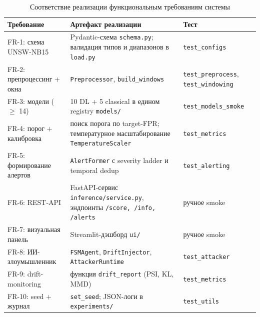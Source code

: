 \begin{table}[H]
\centering
\caption{Соответствие реализации функциональным требованиям системы}
\label{tab:traceability}
\renewcommand{\arraystretch}{1.2}
\setlength{\tabcolsep}{4pt}
\footnotesize
\begin{tabularx}{\linewidth}{@{}p{2.6cm}Xp{2.8cm}@{}}
\toprule
\textbf{Требование} & \textbf{Артефакт реализации} & \textbf{Тест} \\
\midrule
FR-1: схема UNSW-NB15      & Pydantic-схема \texttt{schema.py}; валидация типов и диапазонов в \texttt{load.py}                        & \texttt{test\_configs} \\
FR-2: препроцессинг + окна & \texttt{Preprocessor}, \texttt{build\_windows}                                                            & \texttt{test\_preprocess}, \texttt{test\_windowing} \\
FR-3: модели ($\geq$ 14)   & 10 DL + 5 classical в едином registry \texttt{models/}                                                    & \texttt{test\_models\_smoke} \\
FR-4: порог + калибровка   & поиск порога по target-FPR; температурное масштабирование \texttt{TemperatureScaler}                      & \texttt{test\_metrics} \\
FR-5: формирование алертов & \texttt{AlertFormer} с severity ladder и temporal dedup                                                   & \texttt{test\_alerting} \\
FR-6: REST-API             & FastAPI-сервис \texttt{inference/service.py}, эндпоинты \texttt{/score, /info, /alerts}                   & ручное smoke \\
FR-7: визуальная панель    & Streamlit-дэшборд \texttt{ui/}                                                                            & ручное smoke \\
FR-8: ИИ-злоумышленник     & \texttt{FSMAgent}, \texttt{DriftInjector}, \texttt{AttackerRuntime}                                       & \texttt{test\_attacker} \\
FR-9: drift-monitoring     & функция \texttt{drift\_report} (PSI, KL, MMD)                                                             & \texttt{test\_metrics} \\
FR-10: seed + журнал       & \texttt{set\_seed}; JSON-логи в \texttt{experiments/}                                                     & \texttt{test\_utils} \\
\bottomrule
\end{tabularx}
\end{table}

